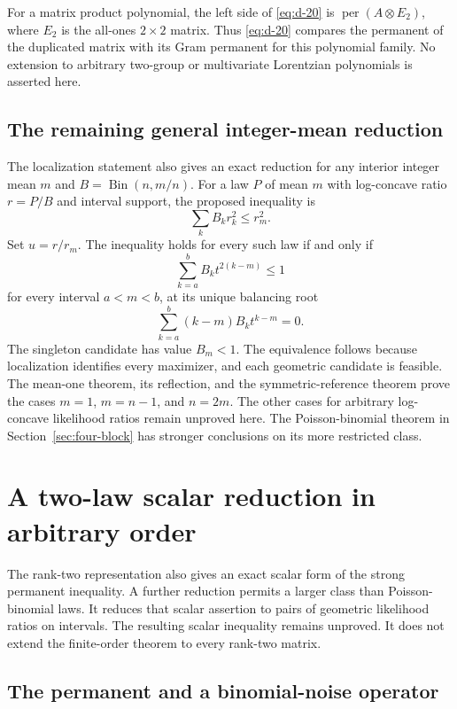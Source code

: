 \documentclass[11pt,a4paper]{article}
\theoremstyle{definition}
\theoremstyle{remark}
\begin{document}
For a matrix product polynomial, the left side of \eqref{eq:d-20} is
\(\operatorname{per}(A\otimes E_2)\), where \(E_2\) is the all-ones
\(2\times2\) matrix. Thus \eqref{eq:d-20} compares the permanent of the duplicated matrix with its Gram permanent for this polynomial family. No extension to arbitrary
two-group or multivariate Lorentzian polynomials is asserted here.

\subsection{The remaining general integer-mean reduction}

The localization statement also gives an exact reduction for any interior integer mean $m$ and $B=\operatorname{Bin}(n,m/n)$.
For a law $P$ of mean $m$ with log-concave ratio $r=P/B$ and interval support, the proposed inequality is
\[
 \sum_k B_kr_k^2\le r_m^2.
\]
Set $u=r/r_m$. The inequality holds for every such law if and only if
\[
 \sum_{k=a}^bB_kt^{2(k-m)}\le1
\]
for every interval $a<m<b$, at its unique balancing root
\[
 \sum_{k=a}^b(k-m)B_kt^{k-m}=0.
\]
The singleton candidate has value $B_m<1$. The equivalence follows because localization identifies every maximizer, and each geometric candidate is feasible. The mean-one theorem, its reflection, and the symmetric-reference theorem prove the cases $m=1$, $m=n-1$, and $n=2m$. The other cases for arbitrary log-concave likelihood ratios remain unproved here. The Poisson-binomial theorem in Section~\ref{sec:four-block} has stronger conclusions on its more restricted class.


\section{A two-law scalar reduction in arbitrary order}\label{sec:r2-scalar-reduction}

The rank-two representation also gives an exact scalar form of the strong permanent inequality.
A further reduction permits a larger class than Poisson-binomial laws.
It reduces that scalar assertion to pairs of geometric likelihood ratios on intervals.
The resulting scalar inequality remains unproved.
It does not extend the finite-order theorem to every rank-two matrix.

\subsection{The permanent and a binomial-noise operator}
\end{document}
